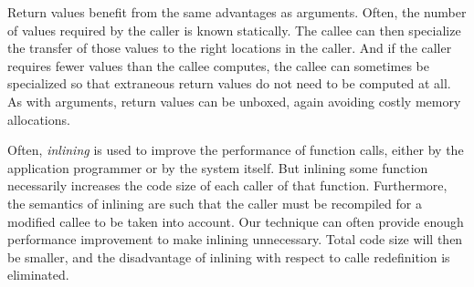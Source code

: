 Return values benefit from the same advantages as arguments.  Often,
the number of values required by the caller is known statically.  The
callee can then specialize the transfer of those values to the right
locations in the caller.  And if the caller requires fewer values than
the callee computes, the callee can sometimes be specialized so that
extraneous return values do not need to be computed at all.  As with
arguments, return values can be unboxed, again avoiding costly memory
allocations.

Often, \emph{inlining} is used to improve the performance of function
calls, either by the application programmer or by the system itself.
But inlining some function necessarily increases the code size of each
caller of that function.  Furthermore, the semantics of inlining are
such that the caller must be recompiled for a modified callee to be
taken into account.  Our technique can often provide enough
performance improvement to make inlining unnecessary.  Total code size
will then be smaller, and the disadvantage of inlining with respect to
calle redefinition is eliminated.
